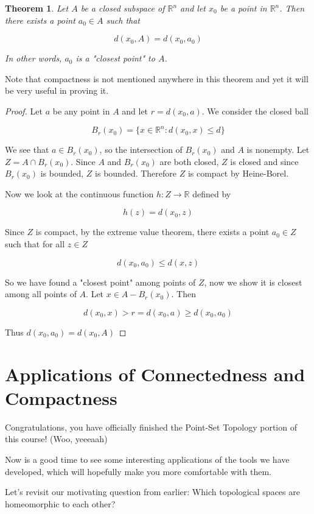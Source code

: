 \documentclass[a4paper]{article}
\newtheorem{theorem}{Theorem}
\numberwithin{theorem}{section}
\begin{document}
\begin{theorem}
Let $A$ be a closed subspace of $\mathbb{R}^n$ and let $x_0$ be a point in $\mathbb{R}^n$. Then there exists a point $a_0 \in A$ such that 

$$ d(x_0,A) = d(x_0,a_0) $$

In other words, $a_0$ is a "closest point" to $A$.
\end{theorem}
Note that compactness is not mentioned anywhere in this theorem and yet it will be very useful in proving it.

\begin{proof}
Let $a$ be any point in $A$ and let $r = d(x_0,a)$. We consider the closed ball

$$ B_r(x_0) = \{ x \in \mathbb{R}^n : d(x_0,x) \leq d\} $$

We see that $a \in B_r(x_0)$, so the intersection of $B_r(x_0)$ and $A$ is nonempty. Let $Z = A \cap B_r(x_0)$. Since $A$ and $B_r(x_0)$ are both closed, $Z$ is closed and since $B_r(x_0)$ is bounded, $Z$ is bounded. Therefore $Z$ is compact by Heine-Borel.

Now we look at the continuous function $h: Z \rightarrow \mathbb{R}$ defined by

$$ h(z) = d(x_0,z) $$

Since $Z$ is compact, by the extreme value theorem, there exists a point $a_0 \in Z$ such that for all $z \in Z$

$$ d(x_0,a_0) \leq d(x,z) $$

So we have found a "closest point" among points of $Z$, now we show it is closest among all points of $A$. Let $x \in A - B_r(x_0)$. Then 

$$ d(x_0,x) > r = d(x_0,a) \geq d(x_0,a_0) $$

Thus $d(x_0,a_0) = d(x_0,A)$

\end{proof}


\section{Applications of Connectedness and Compactness}

Congratulations, you have officially finished the Point-Set Topology portion of this course! (Woo, yeeeaah)

Now is a good time to see some interesting applications of the tools we have developed, which will hopefully make you more comfortable with them.

Let's revisit our motivating question from earlier: Which topological spaces are homeomorphic to each other?
\end{document}
